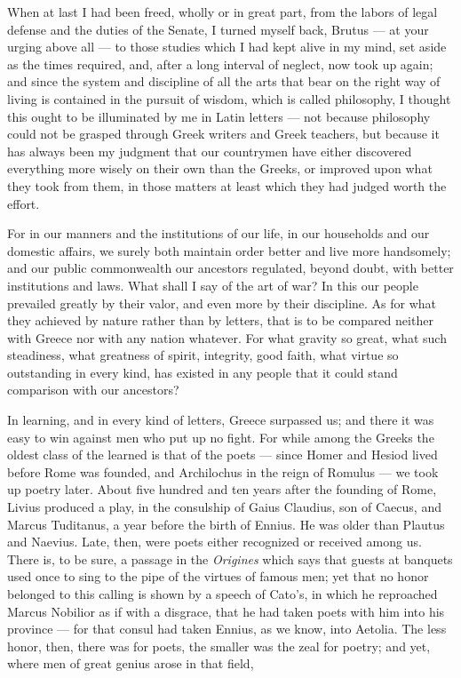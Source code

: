 

 When at last I had been freed, wholly or in great part, from the labors of legal defense and the duties of the Senate, I turned myself back, Brutus — at your urging above all — to those studies which I had kept alive in my mind, set aside as the times required, and, after a long interval of neglect, now took up again; and since the system and discipline of all the arts that bear on the right way of living is contained in the pursuit of wisdom, which is called philosophy, I thought this ought to be illuminated by me in Latin letters — not because philosophy could not be grasped through Greek writers and Greek teachers, but because it has always been my judgment that our countrymen have either discovered everything more wisely on their own than the Greeks, or improved upon what they took from them, in those matters at least which they had judged worth the effort.

 For in our manners and the institutions of our life, in our households and our domestic affairs, we surely both maintain order better and live more handsomely; and our public commonwealth our ancestors regulated, beyond doubt, with better institutions and laws. What shall I say of the art of war? In this our people prevailed greatly by their valor, and even more by their discipline. As for what they achieved by nature rather than by letters, that is to be compared neither with Greece nor with any nation whatever. For what gravity so great, what such steadiness, what greatness of spirit, integrity, good faith, what virtue so outstanding in every kind, has existed in any people that it could stand comparison with our ancestors?

 In learning, and in every kind of letters, Greece surpassed us; and there it was easy to win against men who put up no fight. For while among the Greeks the oldest class of the learned is that of the poets — since Homer and Hesiod lived before Rome was founded, and Archilochus in the reign of Romulus — we took up poetry later. About five hundred and ten years after the founding of Rome, Livius produced a play, in the consulship of Gaius Claudius, son of Caecus, and Marcus Tuditanus, a year before the birth of Ennius. He was older than Plautus and Naevius. Late, then, were poets either recognized or received among us. There is, to be sure, a passage in the \textit{Origines} which says that guests at banquets used once to sing to the pipe of the virtues of famous men; yet that no honor belonged to this calling is shown by a speech of Cato's, in which he reproached Marcus Nobilior as if with a disgrace, that he had taken poets with him into his province — for that consul had taken Ennius, as we know, into Aetolia. The less honor, then, there was for poets, the smaller was the zeal for poetry; and yet, where men of great genius arose in that field,


